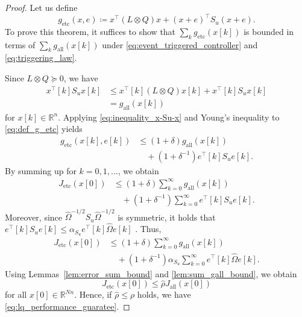 \documentclass[letterpaper,10pt,conference]{ieeeconf}
\newcommand{\R}{\mathbb{R}}
\begin{document}
\begin{proof}
  Let us define
  \begin{equation} \label{eq:def_g_etc}
    g_{\mathrm{etc}}(x,e) \coloneqq x^\top (L \otimes Q)x + (x+e)^\top S_u (x+e).
  \end{equation}
  To prove this theorem, it suffices to show that $\sum_k g_{\mathrm{etc}}(x[k])$ is bounded in terms of $\sum_k g_{\mathrm{all}}(x[k])$ under \eqref{eq:event_triggered_controller} and \eqref{eq:triggering_law}.

  Since $L \otimes Q \succeq 0$, we have
  \begin{align}
    x^\top[k] S_u x[k] &\leq x^\top[k] (L \otimes Q)x[k] + x^\top[k] S_u x[k] \\
    &= g_{\mathrm{all}}(x[k]) \label{eq:inequality_x-Su-x}
  \end{align}
  for $x[k]\in \R^n$.
  Applying \eqref{eq:inequality_x-Su-x} and Young's inequality to \eqref{eq:def_g_etc} yields
  \begin{align}
    g_{\mathrm{etc}}(x[k],e[k]) &\leq (1 + \delta) g_{\mathrm{all}}(x[k]) \\
    &\quad + (1 + \delta^{-1}) e^\top[k] S_u e[k].
  \end{align}
  By summing up for $k=0,1,\dots$, we obtain
  \begin{align}
    J_{\mathrm{etc}}(x[0]) &\leq (1 + \delta) \sum_{k=0}^{\infty} g_{\mathrm{all}}(x[k]) \\
    &\quad + (1 + \delta^{-1}) \sum_{k=0}^{\infty} e^\top[k] S_u e[k].
  \end{align}
  Moreover, since $\hat\Omega^{-1/2} S_u \hat\Omega^{-1/2}$ is symmetric, it holds that $e^\top[k] S_u e[k] \leq \alpha_{S_u} e^\top[k] \hat\Omega e[k]$ \cite{boyd2004convex}.
  Thus,
  \begin{align}
    J_{\mathrm{etc}}(x[0]) &\leq (1 + \delta) \sum_{k=0}^{\infty} g_{\mathrm{all}}(x[k]) \\
    &\quad + (1 + \delta^{-1}) \alpha_{S_u} \sum_{k=0}^{\infty}  e^\top[k] \hat\Omega e[k].
  \end{align}
  Using Lemmas~\ref{lem:error_sum_bound} and \ref{lem:sum_gall_bound}, we obtain
  \begin{equation}
    J_{\mathrm{etc}}(x[0]) \leq \hat\rho J_{\mathrm{all}}(x[0])
  \end{equation}
  for all $x[0] \in \R^{Nn}$.
  Hence, if $\hat\rho \leq \rho$ holds, we have \eqref{eq:lq_performance_guaratee}.
\end{proof}
\end{document}
